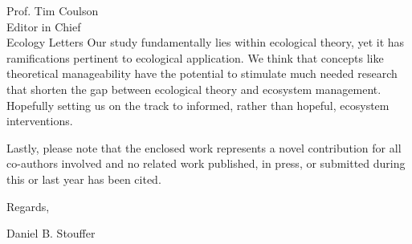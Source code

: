 \documentclass[10pt, a4paper]{letter}
\begin{document}
\begin{letter}{
       Prof. Tim Coulson\\
       Editor in Chief\\
       Ecology Letters}
Our study fundamentally lies within ecological theory, yet it has ramifications pertinent to ecological application. 
We think that concepts like theoretical manageability have the potential to stimulate much needed research that shorten the gap between ecological theory and ecosystem management.
Hopefully setting us on the track to informed, rather than hopeful, ecosystem interventions. 

Lastly, please note that the enclosed work represents a novel contribution for all co-authors involved and no related work published, in press, or submitted during this or last year has been cited. 

\closing{Regards,}

Daniel B. Stouffer

\end{letter}
\end{document}
